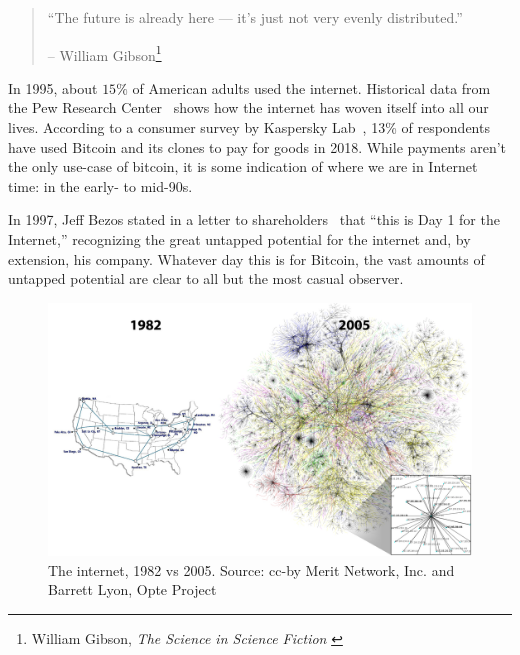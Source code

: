 \begin{quotation}\begin{samepage}
\enquote{The future is already here --- it's just not very evenly
distributed.}
\begin{flushright} -- William Gibson\footnote{William Gibson, \textit{The Science in Science Fiction} \cite{william-gibson}}
\end{flushright}\end{samepage}\end{quotation}

In 1995, about $15\%$ of American adults used the internet. Historical
data from the Pew Research Center~\cite{pew-research} shows how the internet has woven
itself into all our lives. According to a consumer survey by Kaspersky
Lab~\cite{web:kaspersky}, 13\% of respondents have used Bitcoin and its clones to pay for
goods in 2018. While payments aren't the only use-case of bitcoin, it is
some indication of where we are in Internet time: in the early- to
mid-90s.

In 1997, Jeff Bezos stated in a letter to shareholders~\cite{bezos-letter} that
\enquote{this is Day 1 for the Internet,} recognizing the great untapped
potential for the internet and, by extension, his company. Whatever day this is
for Bitcoin, the vast amounts of untapped potential are clear to all but the
most casual observer.

\begin{figure}
  \includegraphics{assets/images/internet-evolution-white-dates.png}
  \caption{The internet, 1982 vs 2005. Source: cc-by Merit Network, Inc. and Barrett Lyon, Opte Project}
  \label{fig:internet-evolution-white-dates}
\end{figure}

